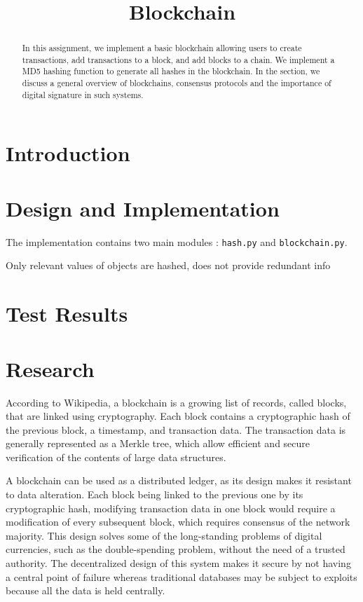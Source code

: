 \documentclass{article}
\title{\textbf{Blockchain}}
\author{}
\date{}
\begin{document}
\maketitle \thispagestyle{fancy}

\begin{abstract}
    In this assignment, we implement a basic blockchain allowing users to create transactions, add transactions to a block, and add blocks to a chain. We implement a MD5 hashing function to generate all hashes in the blockchain. In the  section, we discuss a general overview of blockchains, consensus protocols and the importance of digital signature in such systems.
\end{abstract}

\section{Introduction}
 
\section{Design and Implementation}

The implementation contains two main modules : \verb+hash.py+ and \verb+blockchain.py+.

Only relevant values of objects are hashed, does not provide redundant info

\section{Test Results}

\section{Research}\label{Research}

According to Wikipedia\cite{wiki:blockchain}, a blockchain is a growing list of records, called blocks, that are linked using cryptography. Each block contains a cryptographic hash of the previous block, a timestamp, and transaction data. The transaction data is generally represented as a Merkle tree, which allow efficient and secure verification of the contents of large data structures.

\bigskip

A blockchain can be used as a distributed ledger, as its design makes it resistant to data alteration. Each block being linked to the previous one by its cryptographic hash, modifying transaction data in one block would require a modification of every subsequent block, which requires consensus of the network majority. This design solves some of the long-standing problems of digital currencies, such as the double-spending problem, without the need of a trusted authority. The decentralized design of this system makes it secure by not having a central point of failure whereas traditional databases may be subject to exploits because all the data is held centrally.
\end{document}
